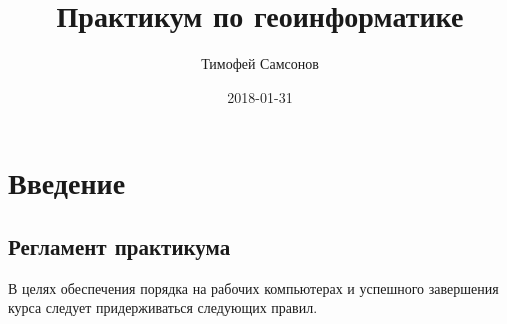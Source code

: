 \documentclass[]{book}
\title{Практикум по геоинформатике}
\author{Тимофей Самсонов}
\date{2018-01-31}
\theoremstyle{definition}
\theoremstyle{definition}
\theoremstyle{definition}
\theoremstyle{remark}
\begin{document}
\maketitle

{
\setcounter{tocdepth}{1}
\tableofcontents
}
\chapter*{Введение}

\hypertarget{-}{%
\section*{Регламент практикума}\label{-}}

В целях обеспечения порядка на рабочих компьютерах и успешного
завершения курса следует придерживаться следующих правил.
\end{document}
